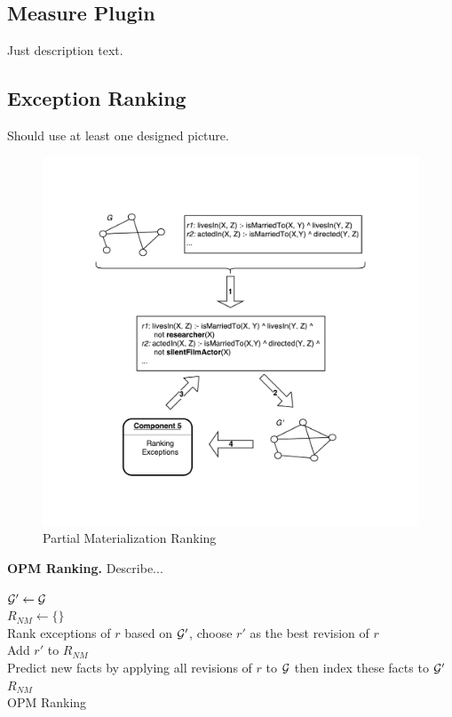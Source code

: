 \subsection{Measure Plugin}

Just description text.

\subsection{Exception Ranking}

Should use at least one designed picture.

\begin{figure}[ht]
\centering
\includegraphics[width=1.0\textwidth]{figures/ranking}
\caption{Partial Materialization Ranking}
\label{pm_ranking}
\end{figure}

\textbf{OPM Ranking.} Describe...

\IncMargin{1.5em}
\begin{algorithm}[H]
\DontPrintSemicolon
\SetAlgoLined
{}
\BlankLine
$\mathcal{G}' \leftarrow \mathcal{G}$\\
$R_{NM} \leftarrow \{\}$\\
\BlankLine
{} {
	Rank exceptions of $r$ based on $\mathcal{G}'$, choose $r'$ as the best revision of $r$\\
	Add $r'$ to $R_{NM}$\\
	Predict new facts by applying all revisions of $r$ to $\mathcal{G}$ then index these facts to $\mathcal{G}'$\\
}
\Return $R_{NM}$\\
\caption{OPM Ranking}
\end{algorithm}
\DecMargin{1.5em}

